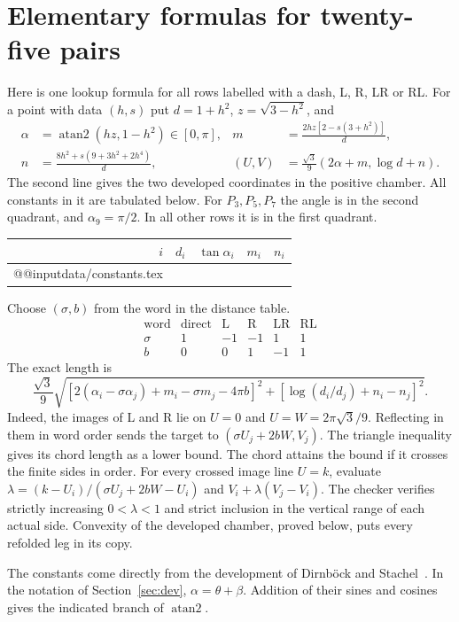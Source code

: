 \documentclass[10pt,letterpaper]{article}
\newcommand{\chapterpage}{\clearpage}
\begin{document}
\chapterpage\section{Elementary formulas for twenty-five pairs}\label{sec:elem}
Here is one lookup formula for all rows labelled with a dash, L, R, LR or RL. For a point with data $(h,s)$ put $d=1+h^2$, $z=\sqrt{3-h^2}$, and
\begin{align*}
 \alpha &=\operatorname{atan2}(hz,1-h^2)\in[0,\pi],&
 m&=\frac{2hz[2-s(3+h^2)]}{d},\\
 n&=\frac{8h^2+s(9+3h^2+2h^4)}{d},&
 (U,V)&=\frac{\sqrt3}{9}\left(2\alpha+m,\log d+n\right).
\end{align*}
The second line gives the two developed coordinates in the positive chamber. All constants in it are tabulated below. For $P_3,P_5,P_7$ the angle is in the second quadrant, and $\alpha_9=\pi/2$. In all other rows it is in the first quadrant.
\begin{center}\small\renewcommand{\arraystretch}{1.16}
\begin{tabular}{@{}rrrrr@{}}\toprule
$i$&$d_i$&$\tan\alpha_i$&$m_i$&$n_i$\\\midrule
\csname @@input\endcsname data/constants.tex 
\bottomrule\end{tabular}\end{center}
Choose $(\sigma,b)$ from the word in the distance table.
\[
\begin{array}{c|ccccc}
 \text{word} & \text{direct} & \mathrm L & \mathrm R & \mathrm{LR} & \mathrm{RL}\\\hline
 \sigma & 1 & -1 & -1 & 1 & 1\\
 b      & 0 & 0  & 1  & -1 & 1
\end{array}
\]
The exact length is
\begin{equation}
 \boxed{\displaystyle
 \frac{\sqrt3}{9}\!
 \sqrt{\left[2(\alpha_i-\sigma\alpha_j)+m_i-\sigma m_j-4\pi b\right]^2+
       \left[\log(d_i/d_j)+n_i-n_j\right]^2}.}
 \label{eq:closed}
\end{equation}
Indeed, the images of L and R lie on $U=0$ and $U=W=2\pi\sqrt3/9$. Reflecting in them in word order sends the target to $(\sigma U_j+2bW,V_j)$. The triangle inequality gives its chord length as a lower bound. The chord attains the bound if it crosses the finite sides in order. For every crossed image line $U=k$, evaluate $\lambda=(k-U_i)/(\sigma U_j+2bW-U_i)$ and $V_i+\lambda(V_j-V_i)$. The checker verifies strictly increasing $0<\lambda<1$ and strict inclusion in the vertical range of each actual side. Convexity of the developed chamber, proved below, puts every refolded leg in its copy.
\par The constants come directly from the development of Dirnböck and Stachel~\cite{ds}. In the notation of Section~\ref{sec:dev}, $\alpha=\theta+\beta$. Addition of their sines and cosines gives the indicated branch of $\operatorname{atan2}$.
\end{document}
